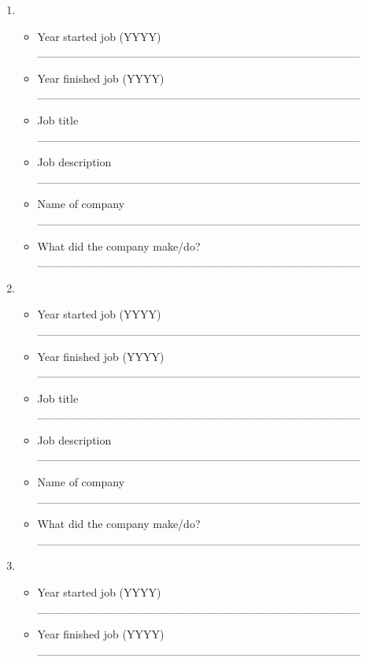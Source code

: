 \documentclass[a4paper,10pt]{article}
\begin{document}
 \begin{enumerate}
  \item
     \begin{itemize}
         \item Year started job (YYYY) \_\_\_\_\_\_\_\_\_\_\_\_\_\_\_\_\_\_\_\_\_\_\_\_\_\_\_\_\_\_\_\_\_\_\_\_\_\_\_ 
         \item Year finished job (YYYY) \_\_\_\_\_\_\_\_\_\_\_\_\_\_\_\_\_\_\_\_\_\_\_\_\_\_\_\_\_\_\_\_\_\_\_\_\_\_\_
         \item Job title \_\_\_\_\_\_\_\_\_\_\_\_\_\_\_\_\_\_\_\_\_\_\_\_\_\_\_\_\_\_\_\_\_\_\_\_\_\_\_
         \item Job description \_\_\_\_\_\_\_\_\_\_\_\_\_\_\_\_\_\_\_\_\_\_\_\_\_\_\_\_\_\_\_\_\_\_\_\_\_\_\_
         \item Name of company \_\_\_\_\_\_\_\_\_\_\_\_\_\_\_\_\_\_\_\_\_\_\_\_\_\_\_\_\_\_\_\_\_\_\_\_\_\_\_
         \item What did the company make/do? \_\_\_\_\_\_\_\_\_\_\_\_\_\_\_\_\_\_\_\_\_\_\_\_\_\_\_\_\_\_\_\_\_\_\_\_\_\_\_
      \end{itemize}
 \item
     \begin{itemize}
         \item Year started job (YYYY) \_\_\_\_\_\_\_\_\_\_\_\_\_\_\_\_\_\_\_\_\_\_\_\_\_\_\_\_\_\_\_\_\_\_\_\_\_\_\_ 
         \item Year finished job (YYYY) \_\_\_\_\_\_\_\_\_\_\_\_\_\_\_\_\_\_\_\_\_\_\_\_\_\_\_\_\_\_\_\_\_\_\_\_\_\_\_
         \item Job title \_\_\_\_\_\_\_\_\_\_\_\_\_\_\_\_\_\_\_\_\_\_\_\_\_\_\_\_\_\_\_\_\_\_\_\_\_\_\_
         \item Job description \_\_\_\_\_\_\_\_\_\_\_\_\_\_\_\_\_\_\_\_\_\_\_\_\_\_\_\_\_\_\_\_\_\_\_\_\_\_\_
         \item Name of company \_\_\_\_\_\_\_\_\_\_\_\_\_\_\_\_\_\_\_\_\_\_\_\_\_\_\_\_\_\_\_\_\_\_\_\_\_\_\_
         \item What did the company make/do? \_\_\_\_\_\_\_\_\_\_\_\_\_\_\_\_\_\_\_\_\_\_\_\_\_\_\_\_\_\_\_\_\_\_\_\_\_\_\_
      \end{itemize}
 \item
     \begin{itemize}
         \item Year started job (YYYY) \_\_\_\_\_\_\_\_\_\_\_\_\_\_\_\_\_\_\_\_\_\_\_\_\_\_\_\_\_\_\_\_\_\_\_\_\_\_\_ 
         \item Year finished job (YYYY) \_\_\_\_\_\_\_\_\_\_\_\_\_\_\_\_\_\_\_\_\_\_\_\_\_\_\_\_\_\_\_\_\_\_\_\_\_\_\_

\end{itemize}
\end{enumerate}
\end{document}
